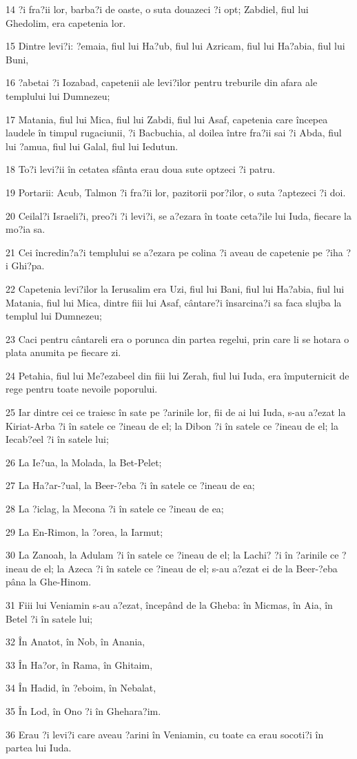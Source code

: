 \par 14 ?i fra?ii lor, barba?i de oaste, o suta douazeci ?i opt; Zabdiel, fiul lui Ghedolim, era capetenia lor.
\par 15 Dintre levi?i: ?emaia, fiul lui Ha?ub, fiul lui Azricam, fiul lui Ha?abia, fiul lui Buni,
\par 16 ?abetai ?i Iozabad, capetenii ale levi?ilor pentru treburile din afara ale templului lui Dumnezeu;
\par 17 Matania, fiul lui Mica, fiul lui Zabdi, fiul lui Asaf, capetenia care începea laudele în timpul rugaciunii, ?i Bacbuchia, al doilea între fra?ii sai ?i Abda, fiul lui ?amua, fiul lui Galal, fiul lui Iedutun.
\par 18 To?i levi?ii în cetatea sfânta erau doua sute optzeci ?i patru.
\par 19 Portarii: Acub, Talmon ?i fra?ii lor, pazitorii por?ilor, o suta ?aptezeci ?i doi.
\par 20 Ceilal?i Israeli?i, preo?i ?i levi?i, se a?ezara în toate ceta?ile lui Iuda, fiecare la mo?ia sa.
\par 21 Cei încredin?a?i templului se a?ezara pe colina ?i aveau de capetenie pe ?iha ?i Ghi?pa.
\par 22 Capetenia levi?ilor la Ierusalim era Uzi, fiul lui Bani, fiul lui Ha?abia, fiul lui Matania, fiul lui Mica, dintre fiii lui Asaf, cântare?i însarcina?i sa faca slujba la templul lui Dumnezeu;
\par 23 Caci pentru cântareli era o porunca din partea regelui, prin care li se hotara o plata anumita pe fiecare zi.
\par 24 Petahia, fiul lui Me?ezabeel din fiii lui Zerah, fiul lui Iuda, era împuternicit de rege pentru toate nevoile poporului.
\par 25 Iar dintre cei ce traiesc în sate pe ?arinile lor, fii de ai lui Iuda, s-au a?ezat la Kiriat-Arba ?i în satele ce ?ineau de el; la Dibon ?i în satele ce ?ineau de el; la Iecab?eel ?i în satele lui;
\par 26 La Ie?ua, la Molada, la Bet-Pelet;
\par 27 La Ha?ar-?ual, la Beer-?eba ?i în satele ce ?ineau de ea;
\par 28 La ?iclag, la Mecona ?i în satele ce ?ineau de ea;
\par 29 La En-Rimon, la ?orea, la Iarmut;
\par 30 La Zanoah, la Adulam ?i în satele ce ?ineau de el; la Lachi? ?i în ?arinile ce ?ineau de el; la Azeca ?i în satele ce ?ineau de el; s-au a?ezat ei de la Beer-?eba pâna la Ghe-Hinom.
\par 31 Fiii lui Veniamin s-au a?ezat, începând de la Gheba: în Micmas, în Aia, în Betel ?i în satele lui;
\par 32 În Anatot, în Nob, în Anania,
\par 33 În Ha?or, în Rama, în Ghitaim,
\par 34 În Hadid, în ?eboim, în Nebalat,
\par 35 În Lod, în Ono ?i în Ghehara?im.
\par 36 Erau ?i levi?i care aveau ?arini în Veniamin, cu toate ca erau socoti?i în partea lui Iuda.

